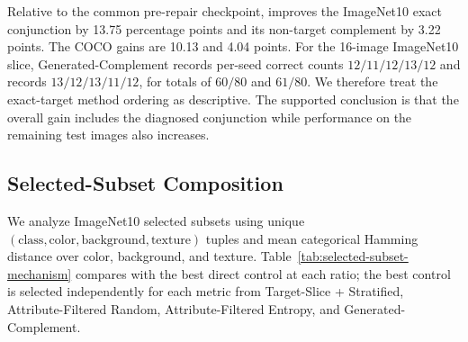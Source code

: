 Relative to the common pre-repair checkpoint, \model improves the ImageNet10 exact conjunction by 13.75 percentage points and its non-target complement by 3.22 points. The COCO gains are 10.13 and 4.04 points. For the 16-image ImageNet10 slice, Generated-Complement records per-seed correct counts $12/11/12/13/12$ and \model records $13/12/13/11/12$, for totals of $60/80$ and $61/80$. We therefore treat the exact-target method ordering as descriptive. The supported conclusion is that the overall gain includes the diagnosed conjunction while performance on the remaining test images also increases.

\subsection{Selected-Subset Composition}

We analyze ImageNet10 selected subsets using unique $(\text{class},\text{color},\text{background},\text{texture})$ tuples and mean categorical Hamming distance over color, background, and texture. Table~\ref{tab:selected-subset-mechanism} compares \model with the best direct control at each ratio; the best control is selected independently for each metric from Target-Slice + Stratified, Attribute-Filtered Random, Attribute-Filtered Entropy, and Generated-Complement.

